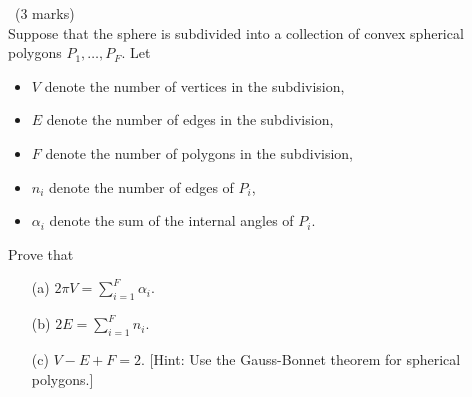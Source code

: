 \documentclass[12pt]{article}
\begin{document}
\newpage

\begin{question}\ (3 marks)\\
  Suppose that the sphere is subdivided into a collection of convex spherical polygons $P_1,\ldots,P_F$. Let
  \begin{itemize}
  \item $V$ denote the number of vertices in the subdivision,
  \item $E$ denote the number of edges in the subdivision,
  \item $F$ denote the number of polygons in the subdivision,
  \item $n_i$ denote the number of edges of $P_i$,
  \item $\alpha_i$ denote the sum of the internal angles of $P_i$.
  \end{itemize}
  Prove that
  \begin{enumerate}
  \item[(a)] $2\pi V=\sum_{i=1}^F\alpha_i$.
  \item[(b)] $2E=\sum_{i=1}^Fn_i$.
  \item[(c)] $V-E+F=2$. [Hint: Use the Gauss-Bonnet theorem for spherical polygons.]
  \end{enumerate}
\end{question}

\iffalse
\begin{answer}
  \begin{enumerate}
  \item[(a)] The sum $\sum_{i=1}^F\alpha_i$ can be expanded as $\sum_{i=1}^F\sum_{v\mbox{ vertex of} P_i}\alpha_i(v)$ where $\alpha_i(v)$ denotes the internal angle of $P_i$ at $v$. This can be rearranged as
    \[\sum_{v\mbox{ vertex of subdivision}}\sum_{\mbox{corners of }P_i{\mbox{ meeting at }v}}\alpha_i(v)\]
    which can be computed as $2\pi V$ because we know that at each vertex the total angle of all polygons meeting at that vertex must be $2\pi$.
  \item[(b)] Every edge in the subdivision occurs as an edge of two polygons, hence summing the total number of edges over all polygons will give twice the number of edges in the subdivision.
  \item[(c)] We have $4\pi=\OP{area}(S^2)=\sum_{i=1}^F(\alpha_i-(n_i-2)\pi)=2\pi V-2\pi E+2\pi F$, so dividing by $2\pi$ gives the answer.
  \end{enumerate}
\end{answer}
\newpage
\fi

\vspace{1cm}
\end{document}
